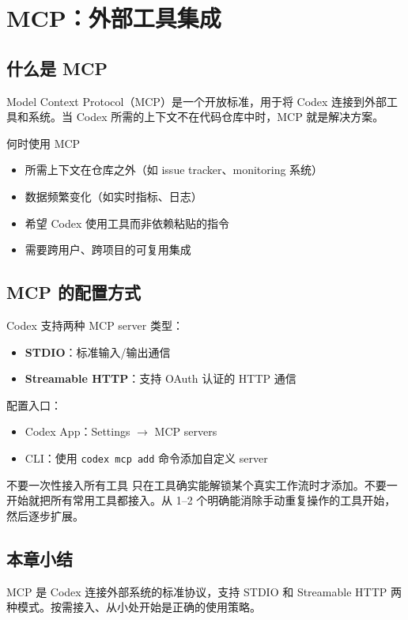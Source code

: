 \section{MCP：外部工具集成}

\subsection{什么是 MCP}

Model Context Protocol（MCP）是一个开放标准，用于将 Codex 连接到外部工具和系统。当 Codex 所需的上下文不在代码仓库中时，MCP 就是解决方案。

\begin{importantbox}{何时使用 MCP}
\begin{itemize}[nosep]
    \item 所需上下文在仓库之外（如 issue tracker、monitoring 系统）
    \item 数据频繁变化（如实时指标、日志）
    \item 希望 Codex 使用工具而非依赖粘贴的指令
    \item 需要跨用户、跨项目的可复用集成
\end{itemize}
\end{importantbox}

\subsection{MCP 的配置方式}

Codex 支持两种 MCP server 类型：

\begin{itemize}
    \item \textbf{STDIO}：标准输入/输出通信
    \item \textbf{Streamable HTTP}：支持 OAuth 认证的 HTTP 通信
\end{itemize}

配置入口：
\begin{itemize}
    \item Codex App：Settings $\rightarrow$ MCP servers
    \item CLI：使用 \texttt{codex mcp add} 命令添加自定义 server
\end{itemize}

\begin{warningbox}{不要一次性接入所有工具}
只在工具确实能解锁某个真实工作流时才添加。不要一开始就把所有常用工具都接入。从 1--2 个明确能消除手动重复操作的工具开始，然后逐步扩展。
\end{warningbox}

\subsection{本章小结}

MCP 是 Codex 连接外部系统的标准协议，支持 STDIO 和 Streamable HTTP 两种模式。按需接入、从小处开始是正确的使用策略。

